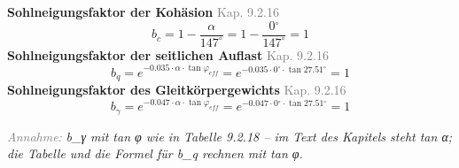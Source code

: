 \documentclass[11pt,a4paper]{article}
\newcommand{\normref}[1]{{\small\textcolor{gray}{#1}}}
\newcommand{\hinweis}[2]{\par\noindent\textcolor{gray}{\textit{#1:}} \textit{#2}\par}
\begin{document}
\noindent\textbf{Sohlneigungsfaktor der Kohäsion} \hfill \normref{Kap. 9.2.16}
\begin{equation*}
b_c = 1 - \frac{\alpha}{147^\circ} = 1 - \frac{0{}^{\circ}}{147^\circ} = 1
\end{equation*}
\noindent\textbf{Sohlneigungsfaktor der seitlichen Auflast} \hfill \normref{Kap. 9.2.16}
\begin{equation*}
b_q = e^{-0.035 \cdot \alpha \cdot \tan \varphi_{eff}} = e^{-0.035 \cdot 0{}^{\circ} \cdot \tan 27.51{}^{\circ}} = 1
\end{equation*}
\noindent\textbf{Sohlneigungsfaktor des Gleitkörpergewichts} \hfill \normref{Kap. 9.2.16}
\begin{equation*}
b_{\gamma} = e^{-0.047 \cdot \alpha \cdot \tan \varphi_{eff}} = e^{-0.047 \cdot 0{}^{\circ} \cdot \tan 27.51{}^{\circ}} = 1
\end{equation*}
\hinweis{Annahme}{b\_γ mit tan φ wie in Tabelle 9.2.18 – im Text des Kapitels steht tan α; die Tabelle und die Formel für b\_q rechnen mit tan φ.}
\end{document}
